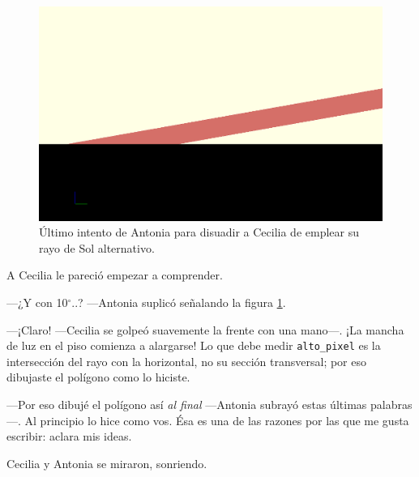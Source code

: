    \begin{figure}[h!]
  \centering
    \includegraphics[width=.5\textwidth]{imagenes/otro-rayo-10}
    \caption[Rayo de Sol alternativo V]{Último intento de Antonia para
      disuadir a Cecilia de emplear su rayo de Sol alternativo.}%
\label{fig:otro-rayo-10}
\end{figure}

A Cecilia le pareció empezar a comprender.

---¿Y con 10$^{\circ}$..? ---Antonia suplicó señalando la figura
\ref{fig:otro-rayo-10}.  

---¡Claro! ---Cecilia se golpeó suavemente la frente con una
mano---. ¡La mancha de luz en el piso comienza a alargarse!  Lo que
debe medir \texttt{alto\_pixel} es la intersección del rayo con la
horizontal, no su sección transversal; por eso dibujaste el polígono
como lo hiciste.

---Por eso dibujé el polígono así \emph{al final} ---Antonia subrayó
estas últimas palabras---. Al principio lo hice como vos. Ésa es una
de las razones por las que me gusta escribir: aclara mis ideas.

Cecilia y Antonia se miraron, sonriendo.

  

